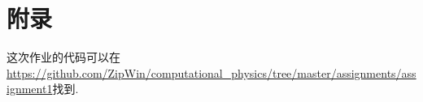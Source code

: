 \documentclass{article}
\begin{document}
	\newpage
	\section*{附录}
	这次作业的代码可以在\url{https://github.com/ZipWin/computational_physics/tree/master/assignments/assignment1}找到.
	
	
	\newpage
	
	
	\newpage
	
	
\end{document}
